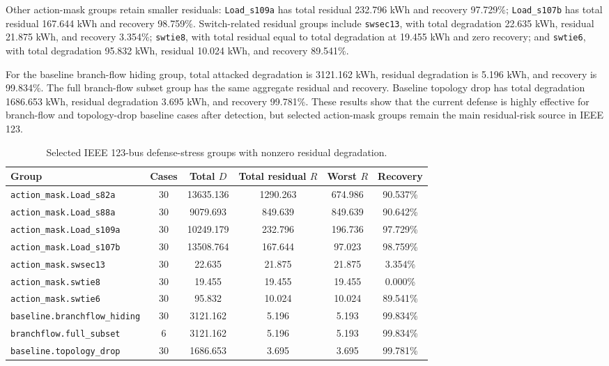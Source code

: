 Other action-mask groups retain smaller residuals: \texttt{Load\_s109a} has total residual 232.796 kWh and recovery 97.729\%; \texttt{Load\_s107b} has total residual 167.644 kWh and recovery 98.759\%. Switch-related residual groups include \texttt{swsec13}, with total degradation 22.635 kWh, residual 21.875 kWh, and recovery 3.354\%; \texttt{swtie8}, with total residual equal to total degradation at 19.455 kWh and zero recovery; and \texttt{swtie6}, with total degradation 95.832 kWh, residual 10.024 kWh, and recovery 89.541\%.

For the baseline branch-flow hiding group, total attacked degradation is 3121.162 kWh, residual degradation is 5.196 kWh, and recovery is 99.834\%. The full branch-flow subset group has the same aggregate residual and recovery. Baseline topology drop has total degradation 1686.653 kWh, residual degradation 3.695 kWh, and recovery 99.781\%. These results show that the current defense is highly effective for branch-flow and topology-drop baseline cases after detection, but selected action-mask groups remain the main residual-risk source in IEEE 123.

\begin{table}[t]
\centering
\caption{Selected IEEE 123-bus defense-stress groups with nonzero residual degradation.}
\label{tab:ieee123_defense_stress}
\scriptsize
\begin{tabular}{lccccc}
\hline
Group & Cases & Total $D$ & Total residual $R$ & Worst $R$ & Recovery \\
\hline
\texttt{action\_mask.Load\_s82a} & 30 & 13635.136 & 1290.263 & 674.986 & 90.537\% \\
\texttt{action\_mask.Load\_s88a} & 30 & 9079.693 & 849.639 & 849.639 & 90.642\% \\
\texttt{action\_mask.Load\_s109a} & 30 & 10249.179 & 232.796 & 196.736 & 97.729\% \\
\texttt{action\_mask.Load\_s107b} & 30 & 13508.764 & 167.644 & 97.023 & 98.759\% \\
\texttt{action\_mask.swsec13} & 30 & 22.635 & 21.875 & 21.875 & 3.354\% \\
\texttt{action\_mask.swtie8} & 30 & 19.455 & 19.455 & 19.455 & 0.000\% \\
\texttt{action\_mask.swtie6} & 30 & 95.832 & 10.024 & 10.024 & 89.541\% \\
\texttt{baseline.branchflow\_hiding} & 30 & 3121.162 & 5.196 & 5.193 & 99.834\% \\
\texttt{branchflow.full\_subset} & 6 & 3121.162 & 5.196 & 5.193 & 99.834\% \\
\texttt{baseline.topology\_drop} & 30 & 1686.653 & 3.695 & 3.695 & 99.781\% \\
\hline
\end{tabular}
\end{table}

